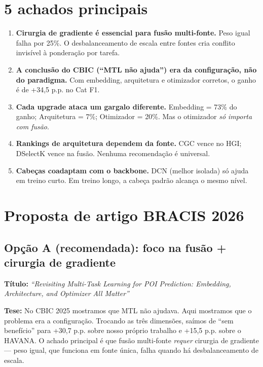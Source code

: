 \documentclass[12pt,a4paper]{article}
\begin{document}
\section{5 achados principais}

\begin{enumerate}[leftmargin=*]
\item \textbf{Cirurgia de gradiente é essencial para fusão multi-fonte.} Peso igual falha por 25\%. O desbalanceamento de escala entre fontes cria conflito invisível à ponderação por tarefa.

\item \textbf{A conclusão do CBIC (``MTL não ajuda'') era da configuração, não do paradigma.} Com embedding, arquitetura e otimizador corretos, o ganho é de +34,5 p.p. no Cat F1.

\item \textbf{Cada upgrade ataca um gargalo diferente.} Embedding = 73\% do ganho; Arquitetura = 7\%; Otimizador = 20\%. Mas o otimizador \textit{só importa com fusão}.

\item \textbf{Rankings de arquitetura dependem da fonte.} CGC vence no HGI; DSelectK vence na fusão. Nenhuma recomendação é universal.

\item \textbf{Cabeças coadaptam com o backbone.} DCN (melhor isolada) só ajuda em treino curto. Em treino longo, a cabeça padrão alcança o mesmo nível.
\end{enumerate}

\section{Proposta de artigo BRACIS 2026}

\subsection{Opção A (recomendada): foco na fusão + cirurgia de gradiente}

\textbf{Título:} \textit{``Revisiting Multi-Task Learning for POI Prediction: Embedding, Architecture, and Optimizer All Matter''}

\textbf{Tese:} No CBIC 2025 mostramos que MTL não ajudava. Aqui mostramos que o problema era a configuração. Trocando as três dimensões, saímos de ``sem benefício'' para +30,7 p.p. sobre nosso próprio trabalho e +15,5 p.p. sobre o HAVANA. O achado principal é que fusão multi-fonte \textit{requer} cirurgia de gradiente --- peso igual, que funciona em fonte única, falha quando há desbalanceamento de escala.
\end{document}

